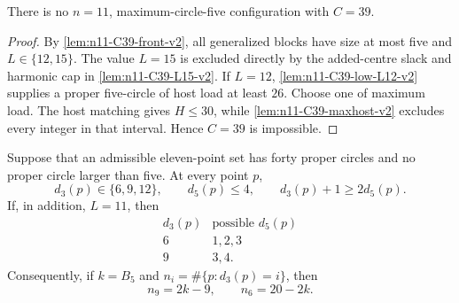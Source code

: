 

\begin{lemma}[K2 routing of the $C=39$ layer]\label{lem:n11-C39}
There is no $n=11$, maximum-circle-five configuration with $C=39$.
\end{lemma}

\begin{proof}
By \cref{lem:n11-C39-front-v2}, all generalized blocks have size at most
five and \(L\in\{12,15\}\).  The value \(L=15\) is excluded directly by
the added-centre slack and harmonic cap in
\cref{lem:n11-C39-L15-v2}.  If \(L=12\),
\cref{lem:n11-C39-low-L12-v2} supplies a proper five-circle of host load at
least \(26\).  Choose one of maximum load.  The host matching gives
\(H\le30\), while \cref{lem:n11-C39-maxhost-v2} excludes every integer in
that interval.  Hence \(C=39\) is impossible.
\end{proof}

\begin{lemma}[$C=40$ pivot spectrum]\label{lem:n11-C40-spectrum}
Suppose that an admissible eleven-point set has forty proper circles and no
proper circle larger than five.  At every point \(p\),
\[
 d_3(p)\in\{6,9,12\},\qquad d_5(p)\le4,\qquad
 d_3(p)+1\ge2d_5(p).
\]
If, in addition, \(L=11\), then
\begin{equation}\label{eq:C40-pivot-domains}
\begin{array}{c|c}
d_3(p)&\text{possible }d_5(p)\\ \hline
6&1,2,3\\
9&3,4.
\end{array}
\end{equation}
Consequently, if \(k=B_5\) and \(n_i=\#\{p:d_3(p)=i\}\), then
\begin{equation}\label{eq:C40-pivot-counts}
 n_9=2k-9,\qquad n_6=20-2k .
\end{equation}
\end{lemma}

